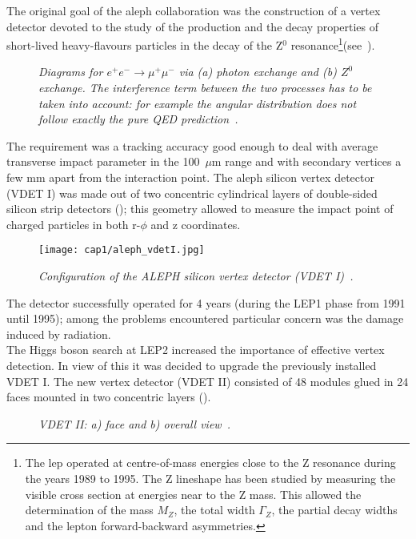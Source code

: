 \hskip 1cm The original goal of the \gls{aleph} collaboration was the
construction of a vertex detector devoted to the study of the production and the
decay properties of short-lived heavy-flavours particles in the decay of the
Z$^0$ resonance\footnote{The \gls{lep} operated at centre-of-mass energies close
  to the Z resonance during the years 1989 to 1995. The Z lineshape has been
  studied by measuring the visible cross section at energies near to the Z
  mass. This allowed the determination of the mass $M_Z$, the total width
  $\Gamma_Z$, the partial decay widths and the lepton forward-backward
  asymmetries.}(see~).
\begin{figure}[!htbp]
  \centering {} 
  \caption{\textit{Diagrams for $e^{+}e^{-} \rightarrow \mu^{+} \mu^{-}$ via (a)
      photon exchange and (b) $Z^0$ exchange. The interference term between the
      two processes has to be taken into account: for example the angular
      distribution does not follow exactly the pure QED
      prediction~\cite{Perkins}.}}\label{z_resonance}
\end{figure}
The requirement was a tracking accuracy good enough to deal with average
transverse impact parameter in the 100~$\mu$m range and with secondary vertices
a few mm apart from the interaction point. The \gls{aleph} silicon vertex
detector (VDET I) was made out of two concentric cylindrical layers of
double-sided silicon strip detectors (); this geometry allowed
to measure the impact point of charged particles in both r-$\phi$ and z
coordinates.
\begin{figure}[!htbp]
  \centering\texttt{[image: cap1/aleph\_vdetI.jpg]}
  \caption{\textit{Configuration of the ALEPH silicon vertex detector (VDET
      I)~\cite{Focardi}.}}\label{aleph_vdetI}
\end{figure}
The detector successfully operated for 4 years (during the LEP1 phase from 1991
until 1995); among the problems encountered
particular concern was the damage induced by radiation.\\
The Higgs boson search at LEP2 increased the importance of effective vertex
detection. In view of this it was decided to upgrade the previously installed
VDET I. The new vertex detector (VDET II) consisted of 48 modules glued in 24
faces mounted in two concentric layers ().
\begin{figure}[!htbp]
  \centering {} 
  \caption{\textit{VDET II: a) face and b) overall
      view~\cite{Aleph}.}}\label{aleph}
\end{figure}

